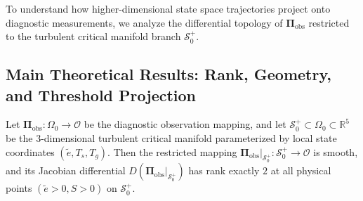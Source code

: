 To understand how higher-dimensional state space trajectories project onto diagnostic measurements, we analyze the differential topology of $\boldsymbol{\Pi}_{\mathrm{obs}}$ restricted to the turbulent critical manifold branch $\mathcal{S}_0^+$.

\subsection{Main Theoretical Results: Rank, Geometry, and Threshold Projection}

\begin{theorem}
\label{thm:projection}
Let $\boldsymbol{\Pi}_{\mathrm{obs}} : \Omega_0 \to \mathcal{O}$ be the diagnostic observation mapping, and let $\mathcal{S}_0^+ \subset \Omega_0 \subset \mathbb{R}^5$ be the 3-dimensional turbulent critical manifold parameterized by local state coordinates $(\tilde e, T_s, T_g)$.
Then the restricted mapping $\boldsymbol{\Pi}_{\mathrm{obs}}\vert_{\mathcal{S}_0^+} : \mathcal{S}_0^+ \to \mathcal{O}$ is smooth, and its Jacobian differential $D\left(\boldsymbol{\Pi}_{\mathrm{obs}}\vert_{\mathcal{S}_0^+}\right)$ has rank exactly $2$ at all physical points $(\tilde e > 0, S > 0)$ on $\mathcal{S}_0^+$.
\end{theorem}

